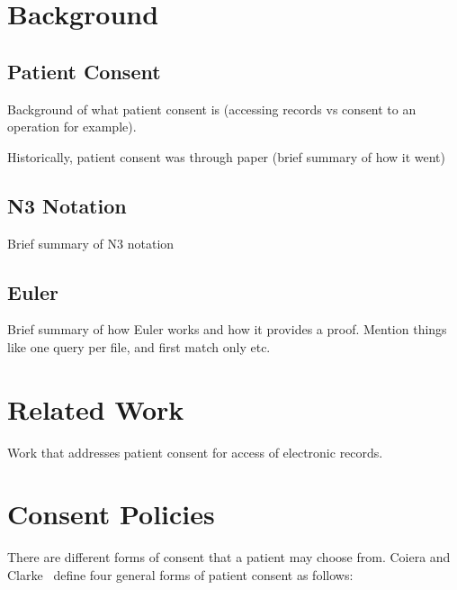 \documentclass[conference]{IEEEtran}
\begin{document}
\section{Background}
\label{bg-sec}

\subsection{Patient Consent}
\label{pat-consent}
Background of what patient consent is (accessing records vs consent to an operation for example).

Historically, patient consent was through paper (brief summary of how it went)


\subsection{N3 Notation}

Brief summary of N3 notation

\subsection{Euler}

Brief summary of how Euler works and how it provides a proof. Mention things like one query per file, and first match only etc.


\section{Related Work}
\label{rel-work}

Work that addresses patient consent for access of electronic records.


\section{Consent Policies}
\label{cons-polic}

There are different forms of consent that a patient may choose from. Coiera and Clarke~\cite{coiera2004consent} define four general forms of patient consent as
follows:
\end{document}
